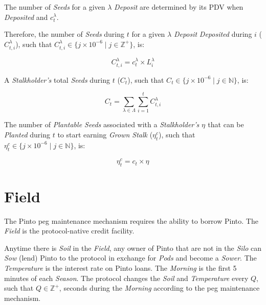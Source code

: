 \documentclass[tikz]{article}
\newcommand{\term}[1]{\textsl{#1}}
\newcommand{\pinto}{} %
\begin{document}
The number of \term{Seeds} for a given $\lambda$ \term{Deposit} are determined by its PDV when \term{Deposited} and $c_{t}^{\lambda}$.

Therefore, the number of \term{Seeds} during $t$ for a given $\lambda$ \term{Deposit} \term{Deposited} during $i$ ($C_{t,i}^{\lambda}$), such that $C_{t,i}^{\lambda} \in \{j \times 10^{-6} \mid j \in \mathbb{Z}^{+} \}$, is:

    $$
        C_{t,i}^{\lambda} = c_{t}^{\lambda} \times L_{i}^{\lambda}
    $$
    
A \term{Stalkholder's} total \term{Seeds} during $t$ ($C_{t}$), such that $C_{t} \in \{j \times 10^{-6} \mid j \in \mathbb{N} \}$, is:

    $$
        C_{t} = 
            \sum_{\lambda \in \Lambda} 
                \sum_{i=1}^{t} 
                    C_{t,i}^{\lambda}
    $$
    
The number of \term{Plantable Seeds} associated with a \term{Stalkholder's} $\eta^{\pinto}$ that can be \term{Planted} during $t$ to start earning \term{Grown Stalk} ($\eta_{t}^{c}$), such that $\eta_{t}^{c} \in \{j \times 10^{-6} \mid j \in \mathbb{N} \}$, is:

    $$
        \eta_{t}^{c} = c_{t}^{\pinto} \times \eta^{\pinto}
    $$


\section{Field}
\vspace{-0.4cm}

The Pinto peg maintenance mechanism requires the ability to borrow Pinto. The \term{Field} is the protocol-native credit facility. 

\vspace{-0.2cm}

Anytime there is \term{Soil} in the \term{Field}, any owner of Pinto that are not in the \term{Silo} can \term{Sow} (lend) Pinto to the protocol in exchange for \term{Pods} and become a \term{Sower}. The \term{Temperature} is the interest rate on Pinto loans. The \term{Morning} is the first 5 minutes of each \term{Season}. The protocol changes the \term{Soil} and \term{Temperature} every $Q$, such that $Q \in \mathbb{Z}^{+}$, seconds during the \term{Morning} according to the peg maintenance mechanism.

\end{document}
